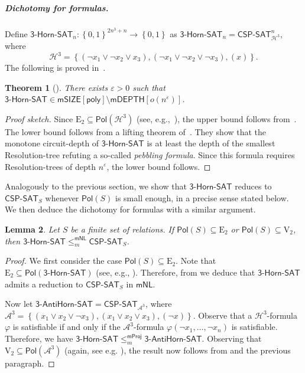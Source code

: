 \documentclass[10pt,a4paper]{article}
\newtheorem{theorem}{Theorem}[section]
\newtheorem{lemma}[theorem]{Lemma}
\newcommand{\eps}{\varepsilon}
\newcommand{\poly}{\mathsf{poly}}
\newcommand{\complexityfont}[1]{\mathsf{#1}}
\newcommand{\monclass}[1]{\mathsf{m}#1}
\newcommand\NL           {\complexityfont{NL}}
\def\mNL          {\monclass{\NL}}
\def\SIZE         {\complexityfont{SIZE}}
\def\DEPTH        {\complexityfont{DEPTH}}
\def\mSIZE        {\monclass{\SIZE}}
\def\mDEPTH       {\monclass{\DEPTH}}
\newcommand{\thornsat}{\mathsf{3\mbox{-}Horn\mbox{-}SAT}}
\newcommand{\tahornsat}{\mathsf{3\mbox{-}AntiHorn\mbox{-}SAT}}
\newcommand{\hornt}{\calh^3}
\newcommand{\ahornt}{\cala^3}
\def\sseq{\subseteq}
\newcommand{\set}[1]{\left\{#1\right\}}
\def\sm{\setminus}
\newcommand{\blt}{\set{0,1}}
\newcommand{\CSPf}[1]{\mathsf{CSP}\text{-}\mathsf{SAT}_{#1}}
\newcommand{\CSPfn}[2]{\CSPf{#1}^{#2}}
\newcommand{\Pol}{\mathsf{Pol}}
\newcommand{\mnlmred}{\leq^{\mNL}_m}
\newcommand{\mprojred}{\leq^{\mathsf{mProj}}_m}
\newcommand{\clonefont}[1]{\mathrm{#1}}
\def\cala{{\mathcal A}}
\def\calh{{\mathcal H}}
\begin{document}
\subparagraph{Dichotomy for formulas.}


Define $\thornsat_n : \blt^{2n^3+n} \to \blt$ 
as $\thornsat_n = \CSPfn{\hornt}{n}$, where
$$
\hornt = \set{
    (\neg x_1 \lor \neg x_2 \lor x_3),
    (\neg x_1 \lor \neg x_2 \lor \neg x_3),
    (x)
}.$$
The following is proved 
in~\cite{DBLP:journals/combinatorica/RazM99, gkrs19}.


\begin{theorem}[\cite{DBLP:journals/combinatorica/RazM99, gkrs19}]
    \label{thm:3hornsat_lb}
    There exists $\eps > 0$
    such that
    $\thornsat \in \mSIZE[\poly] \sm \mDEPTH[o(n^\eps)]$.
\end{theorem}
\begin{proof}[Proof sketch]
    Since $\clonefont{E_2} \sseq \Pol(\hornt)$ (see,
    e.g.,~\cite[Lemma 4.8]{DBLP:books/daglib/0004131}),
    the upper bound follows from~.
    The lower bound follows from a lifting theorem
    of~\cite{DBLP:journals/combinatorica/RazM99,gkrs19}.
    They show that 
    the monotone circuit-depth of $\thornsat$
    is at least the
    depth of the smallest Resolution-tree
    refuting a so-called \emph{pebbling formula}.
    Since this formula requires Resolution-trees of depth $n^\eps$,
    the lower bound follows.
\end{proof}

Analogously to the previous section, we show that $\thornsat$ reduces
to $\CSPf{S}$ whenever
$\Pol(S)$ is small enough, in 
a precise sense stated below.
We then deduce the dichotomy for formulas with a similar argument.

\begin{lemma}
    \label{lem:l3_hornsat}
    Let $S$ be a finite set of relations.
    If 
    $\Pol(S) \sseq \clonefont{E_2}$ or $\Pol(S) \sseq \clonefont{V_2}$,
    then
    $\thornsat \mnlmred \CSPf{S}$.
\end{lemma}
\begin{proof}
    We first consider the case $\Pol(S) \sseq \clonefont{E_2}$.
    Note that
    $\clonefont{E_2} \sseq \Pol(\thornsat)$
    (see, e.g., \cite[Lemma 4.8]{DBLP:books/daglib/0004131}).
    Therefore, from  we deduce
    that $\thornsat$ admits a reduction to
    $\CSPf{S}$ in $\mNL$.

    Now let
    $\tahornsat = \CSPf{\ahornt}$,
    where
    $\ahornt = 
    \set{
        (x_1 \lor x_2 \lor \neg x_3),
        (x_1 \lor x_2 \lor x_3),
        (\neg x)
    }$.
    Observe that a
    $\hornt$-formula $\varphi$
    is satisfiable if and only if
    the $\ahornt$-formula 
    $\varphi(\neg x_1,\dots,\neg x_n)$
    is satisfiable.
    Therefore, we have
    $\thornsat \mprojred \tahornsat$.
    Observing that
    $\clonefont{V_2} \sseq \Pol(\ahornt)$
    (again, see e.g. \cite[Lemma 4.8]{DBLP:books/daglib/0004131}),
    the result now follows from
     and the previous paragraph.
\end{proof}
\end{document}
